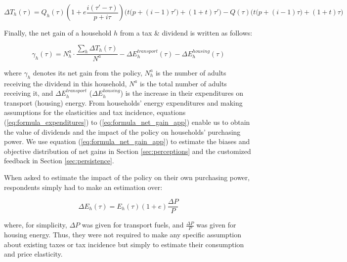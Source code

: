 \documentclass[12pt]{article} %
\begin{document}
\begin{appendices}
\begin{equation}
\label{eq:formula_dividend}
    \Delta T_h\left(\tau\right) = Q_h\left(\tau\right) \left( 1 + e \frac{i\left(\tau' - \tau\right)}{p + i \tau} \right) \bigg( t \big(p + \left(i-1\right)\tau' \big) + \left(1+t\right) \tau' \bigg) - Q\left(\tau\right) \bigg( t \big(p + \left(i-1\right)\tau \big) + \left(1+t\right) \tau \bigg)
\end{equation}

\noindent
Finally, the net gain of a household $h$ from a tax \& dividend is written as follows:

\begin{equation}
\label{eq:formula_net_gain_app}
    \gamma_h(\tau) = N^a_h \cdot \frac{\sum_h \Delta T_h(\tau)}{N^a} - \Delta E_h^{transport}(\tau) - \Delta E_h^{housing}(\tau)
\end{equation}

\noindent
where $\gamma_h$ denotes its net gain from the policy, $N^a_h$ is the number of adults receiving the dividend in this household, $N^a$ is the total number of adults receiving it, and $\Delta E_h^{transport}$ ($\Delta E_h^{housing}$) is the increase in their expenditures on transport (housing) energy. From households' energy expenditures and making assumptions for the elasticities and tax incidence, equations (\ref{eq:formula_expenditures}) to (\ref{eq:formula_net_gain_app}) enable us to obtain the value of dividends and the impact of the policy on households' purchasing power. We use equation (\ref{eq:formula_net_gain_app}) to estimate the biases and objective distribution of net gains in Section \ref{sec:perceptions} and the customized feedback in Section \ref{sec:persistence}.

When asked to estimate the impact of the policy on their own purchasing power, respondents simply had to make an estimation over:



$$
\Delta E_h\left(\tau\right) = E_h\left(\tau\right)\left(1+e\right) \frac{\Delta P}{P}
$$

\noindent
where, for simplicity, $\Delta P$ was given for transport fuels, and $\frac{\Delta P}{P}$ was given for housing energy. Thus, they were not required to make any specific assumption about existing taxes or tax incidence but simply to estimate their consumption and price elasticity.


\end{appendices}
\end{document}
